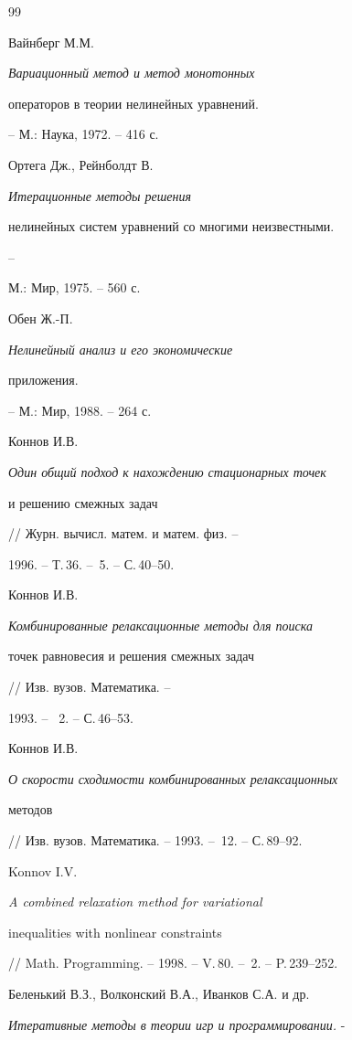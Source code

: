 \begin{thebibliography}{99}







Вайнберг М.М. {\em Вариационный метод и метод монотонных


операторов в теории нелинейных уравнений.} -- М.: Наука, 1972. -- 416 с.




Ортега Дж., Рейнболдт В. {\em Итерационные методы решения


нелинейных систем уравнений со многими неизвестными.} --


М.: Мир, 1975. -- 560 с.




Обен Ж.-П. {\em Нелинейный анализ и его экономические


приложения.} -- М.: Мир, 1988. -- 264 с.




Коннов И.В. {\em Один общий подход к нахождению стационарных точек


и решению смежных задач} // Журн. вычисл. матем. и матем. физ. --


1996. -- Т.\,36. -- \No\,5. -- С.\,40--50.




Коннов И.В. {\em Комбинированные релаксационные методы для поиска


точек равновесия и решения смежных задач} // Изв. вузов. Математика. --


1993. -- \No\, 2. -- С.\,46--53.




Коннов И.В.{\em О скорости сходимости комбинированных релаксационных


методов} // Изв. вузов. Математика. -- 1993. -- \No\,12. -- С.\,89--92.




Konnov I.V. {\em A combined relaxation method for variational


inequalities with nonlinear constraints}


// Math. Programming. -- 1998. -- V.\,80. -- \No\,2. -- P.\,239--252.




Беленький В.З., Волконский В.А., Иванков С.А. и др.


{\em Итеративные методы в теории игр и программировании.} -



\end{thebibliography}
